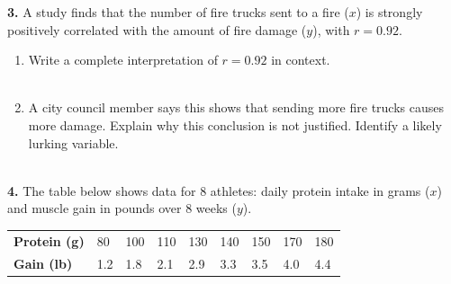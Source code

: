 \documentclass[10pt]{article}
\begin{document}
\vspace{0.2in}

\noindent\textbf{3.} A study finds that the number of fire trucks sent to a fire ($x$) is
strongly positively correlated with the amount of fire damage ($y$), with $r = 0.92$.

\begin{enumerate}[label=\textbf{(\alph*)}, leftmargin=2em, itemsep=0.16in]
  \item Write a complete interpretation of $r = 0.92$ in context.\\[8pt]
        \\[3pt]
        \ansline{}
  \item A city council member says this shows that sending more fire trucks causes more
        damage. Explain why this conclusion is not justified. Identify a likely lurking
        variable.\\[8pt]
        \\[3pt]
        \ansline{}
\end{enumerate}

\vspace{0.2in}

\noindent\textbf{4.} The table below shows data for 8 athletes: daily protein intake in grams
($x$) and muscle gain in pounds over 8 weeks ($y$).

\vspace{8pt}
\renewcommand{\arraystretch}{1.4}
\begin{tabularx}{\linewidth}{@{} l *{8}{C{1cm}} @{}}
\textbf{Protein (g)} & 80 & 100 & 110 & 130 & 140 & 150 & 170 & 180 \\
\textbf{Gain (lb)}   & 1.2 & 1.8 & 2.1 & 2.9 & 3.3 & 3.5 & 4.0 & 4.4 \\
\end{tabularx}
\end{document}
